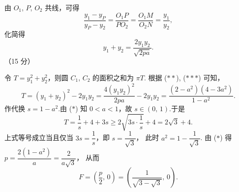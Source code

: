 \documentclass{chsmc}
\begin{document}
\begin{enumerate}[resume]
\begin{solution}
      由 $O_1$, $P$, $O_2$ 共线，可得
      \[
        \frac{y_1 - y_P}{y_P - y_2}
        = \frac{O_1 P}{PO_2}
        = \frac{O_1 M}{O_2 N}
        = \frac{y_1}{y_2},
      \]
      化简得
      \[
        y_1 + y_2 = \frac{2 y_1 y_2}{\sqrt{2pa}}. \tag{$***$}
      \]\hfill（15 分）

      令 $T = y_1^2 + y_2^2$，则圆 $C_1$, $C_2$ 的面积之和为 $\pi T$.
      根据 ($**$), ($***$) 可知，
      \[
        T = (y_1 + y_2)^2 - 2y_1 y_2
          = \frac{4(y_1 y_2)^2}{2pa} - 2y_1 y_2
          = \frac{(2 - a^2)(4 - 3a^2)}{1 - a^2}.
      \]
      作代换 $s = 1 - a^2$.由 ($*$) 知 $0 < a < 1$，故 $s \in (0,\,1)$.于是
      \[
        T = \frac{1}{s} + 4 + 3s
          \geq 2\sqrt{3s \cdot \frac{1}{s}} + 4
          = 2\sqrt{3} + 4.
      \]
      上式等号成立当且仅当 $3s = \dfrac{1}{s}$，即 $s = \dfrac{1}{\sqrt{3}}$，
      此时 $a^2 = 1 - \dfrac{1}{\sqrt{3}}$.
      由 ($*$) 得 $p = \dfrac{2(1-a^2)}{a} = \dfrac{2}{a\sqrt{3}}$，
      从而
      \[
        F = \left(\frac{p}{2},\, 0\right)
          = \left(\frac{1}{\sqrt{3-\sqrt{3}}},\, 0\right).
      \]
    \end{solution}
\end{enumerate}
\end{document}
